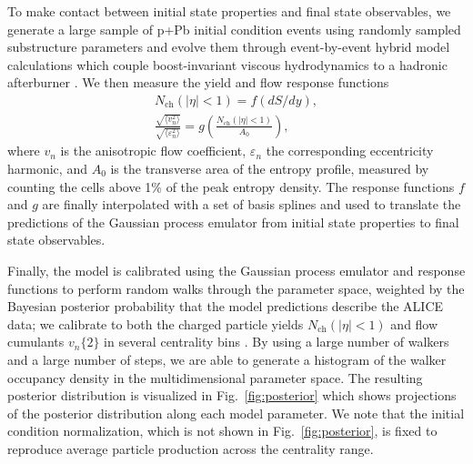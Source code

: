 \documentclass[3p,times,procedia]{elsarticle}
\newcommand{\vn}{\sqrt{\langle v_n^2 \rangle}}
\newcommand{\en}{\sqrt{\langle \varepsilon_n^2 \rangle}}
\begin{document}
To make contact between initial state properties and final state observables, we generate a large sample of p+Pb initial condition events using randomly sampled substructure parameters and evolve them through event-by-event hybrid model calculations which couple boost-invariant viscous hydrodynamics to a hadronic afterburner \cite{Shen:2014vra}.
We then measure the yield and flow response functions 
\begin{align}
  \label{response}
  N_\mathrm{ch}(|\eta| < 1) = f(dS/dy), \\
  \frac{\vn}{\en} = g\left(\frac{N_\mathrm{ch}(|\eta| < 1)}{A_0}\right),
\end{align}
where $v_n$ is the anisotropic flow coefficient, $\varepsilon_n$ the corresponding eccentricity harmonic, and $A_0$ is the transverse area of the entropy profile, measured by counting the cells above 1\% of the peak entropy density. 
The response functions $f$ and $g$ are finally interpolated with a set of basis splines and used to translate the predictions of the Gaussian process emulator from initial state properties to final state observables. 

Finally, the model is calibrated using the Gaussian process emulator and response functions to perform random walks through the parameter space, weighted by the Bayesian posterior probability that the model predictions describe the ALICE data; we calibrate to both the charged particle yields $N_\mathrm{ch}(|\eta| < 1)$ and flow cumulants $v_n\{2\}$ in several centrality bins \cite{Abelev:2014mda}.
By using a large number of walkers and a large number of steps, we are able to generate a histogram of the walker occupancy density in the multidimensional parameter space.
The resulting posterior distribution is visualized in Fig.~\ref{fig:posterior} which shows projections of the posterior distribution along each model parameter.
We note that the initial condition normalization, which is not shown in Fig.~\ref{fig:posterior}, is fixed to reproduce average particle production across the centrality range.
\end{document}
